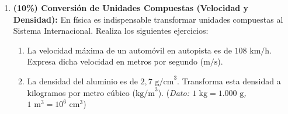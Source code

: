 \documentclass[11pt, letterpaper]{article}
\newif\ifshowanswers
\newcommand{\answer}[1]{
	\ifshowanswers
	\par\vspace{0.15cm}
	\begin{tcolorbox}[colback=blue!5!white, colframe=blue!60!white, arc=1mm, boxrule=0.5pt, title=\textbf{\footnotesize SOLUCIÓN PASO A PASO (DOCENTE)}]
		\color{blue!80!black}\footnotesize #1
	\end{tcolorbox}
	\par\vspace{0.15cm}
	\else
	\par\vspace{0.3cm}
	\fi
}
\begin{document}
\begin{enumerate}[leftmargin=*, itemsep=0.8cm]
		\item \textbf{(10\%) Conversión de Unidades Compuestas (Velocidad y Densidad):} 
		En física es indispensable transformar unidades compuestas al Sistema Internacional. Realiza los siguientes ejercicios:
		\begin{enumerate}[label=\alph*), itemsep=0.2cm]
			\item La velocidad máxima de un automóvil en autopista es de $108\text{ km/h}$. Expresa dicha velocidad en metros por segundo ($\text{m/s}$).
			\item La densidad del aluminio es de $2,7\text{ g/cm}^3$. Transforma esta densidad a kilogramos por metro cúbico ($\text{kg/m}^3$). \quad (\textit{Dato: $1\text{ kg} = 1.000\text{ g}$, $1\text{ m}^3 = 10^6\text{ cm}^3$})
		\end{enumerate}
		
		\answer{
			\textbf{Procedimiento explícito:}
			\begin{itemize}[itemsep=0.2cm]
				\item a) $108\text{ }\frac{\text{km}}{\text{h}} \times \left(\frac{1.000\text{ m}}{1\text{ km}}\right) \times \left(\frac{1\text{ h}}{3.600\text{ s}}\right) = \frac{108.000}{3.600} = \mathbf{30\text{ m/s}}$.
				\item b) $2,7\text{ }\frac{\text{g}}{\text{cm}^3} \times \left(\frac{1\text{ kg}}{1.000\text{ g}}\right) \times \left(\frac{10^6\text{ cm}^3}{1\text{ m}^3}\right) = 2,7 \times \frac{1.000.000}{1.000} = 2,7 \times 1.000 = \mathbf{2.700\text{ kg/m}^3}$.
			\end{itemize}
		}
		

\end{enumerate}
\end{document}
